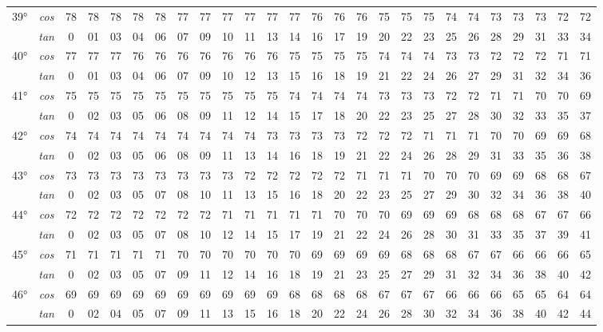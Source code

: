 \begin{tiny}
\begin{longtable}{c c |c |c |c |c |c |c |c |c |c |c |c |c |c |c |c |c |c |c |c |c |c |c |c |c}
		\multirow{2}{*}{39°}&\textit{cos}& 78& 78& 78& 78& 78& 77& 77& 77& 77& 77& 77& 76& 76& 76& 75& 75& 75& 74& 74& 73& 73& 73& 72& 72\\* \space&\textit{tan} & 0 & 01 & 03 & 04 & 06 & 07 & 09& 10& 11& 13& 14& 16& 17& 19& 20& 22& 23& 25& 26& 28& 29& 31& 33& 34\\\hline
		\multirow{2}{*}{40°}&\textit{cos}& 77& 77& 77& 76& 76& 76& 76& 76& 76& 76& 75& 75& 75& 75& 74& 74& 74& 73& 73& 72& 72& 72& 71& 71\\* \space&\textit{tan} & 0 & 01 & 03 & 04 & 06 & 07 & 09& 10& 12& 13& 15& 16& 18& 19& 21& 22& 24& 26& 27& 29& 31& 32& 34& 36\\\hline
		\multirow{2}{*}{41°}&\textit{cos}& 75& 75& 75& 75& 75& 75& 75& 75& 75& 75& 74& 74& 74& 74& 73& 73& 73& 72& 72& 71& 71& 70& 70& 69\\* \space&\textit{tan} & 0 & 02 & 03 & 05 & 06 & 08 & 09& 11& 12& 14& 15& 17& 18& 20& 22& 23& 25& 27& 28& 30& 32& 33& 35& 37\\\hline
		\multirow{2}{*}{42°}&\textit{cos}& 74& 74& 74& 74& 74& 74& 74& 74& 74& 73& 73& 73& 73& 72& 72& 72& 71& 71& 71& 70& 70& 69& 69& 68\\* \space&\textit{tan} & 0 & 02 & 03 & 05 & 06 & 08 & 09& 11& 13& 14& 16& 18& 19& 21& 22& 24& 26& 28& 29& 31& 33& 35& 36& 38\\\hline
		\multirow{2}{*}{43°}&\textit{cos}& 73& 73& 73& 73& 73& 73& 73& 73& 72& 72& 72& 72& 72& 71& 71& 71& 70& 70& 70& 69& 69& 68& 68& 67\\* \space&\textit{tan} & 0 & 02 & 03 & 05 & 07 & 08& 10& 11& 13& 15& 16& 18& 20& 22& 23& 25& 27& 29& 30& 32& 34& 36& 38& 40\\\hline
		\multirow{2}{*}{44°}&\textit{cos}& 72& 72& 72& 72& 72& 72& 72& 71& 71& 71& 71& 71& 70& 70& 70& 69& 69& 69& 68& 68& 68& 67& 67& 66\\* \space&\textit{tan} & 0 & 02 & 03 & 05 & 07 & 08& 10& 12& 14& 15& 17& 19& 21& 22& 24& 26& 28& 30& 31& 33& 35& 37& 39& 41\\\hline
		\multirow{2}{*}{45°}&\textit{cos}& 71& 71& 71& 71& 71& 70& 70& 70& 70& 70& 70& 69& 69& 69& 69& 68& 68& 68& 67& 67& 66& 66& 66& 65\\* \space&\textit{tan} & 0 & 02 & 03 & 05 & 07 & 09& 11& 12& 14& 16& 18& 19& 21& 23& 25& 27& 29& 31& 32& 34& 36& 38& 40& 42\\\hline
		\multirow{2}{*}{46°}&\textit{cos}& 69& 69& 69& 69& 69& 69& 69& 69& 69& 69& 68& 68& 68& 68& 67& 67& 67& 66& 66& 66& 65& 65& 64& 64\\* \space&\textit{tan} & 0 & 02 & 04 & 05 & 07 & 09& 11& 13& 15& 16& 18& 20& 22& 24& 26& 28& 30& 32& 34& 36& 38& 40& 42& 44\\\hline

\end{longtable}
\end{tiny}
